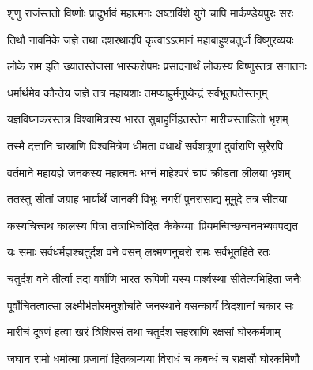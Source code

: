 

\translink{}

\storymeta



\twolineshloka
{शृणु राजंस्ततो विष्णोः प्रादुर्भावं महात्मनः}
{अष्टाविंशे युगे चापि मार्कण्डेयपुरः सरः}


\twolineshloka
{तिथौ नावमिके जज्ञे तथा दशरथादपि}
{कृत्वाऽऽत्मानं महाबाहुश्चतुर्धा विष्णुरव्ययः}


\twolineshloka
{लोके राम इति ख्यातस्तेजसा भास्करोपमः}
{प्रसादनार्थं लोकस्य विष्णुस्तत्र सनातनः}


\twolineshloka
{धर्मार्थमेव कौन्तेय जज्ञे तत्र महायशाः}
{तमप्याहुर्मनुष्येन्द्रं सर्वभूतपतेस्तनुम्}


\twolineshloka
{यज्ञविघ्नकरस्तत्र विश्वामित्रस्य भारत}
{सुबाहुर्निहतस्तेन मारीचस्ताडितो भृशम्}


\twolineshloka
{तस्मै दत्तानि चास्राणि विश्वमित्रेण धीमता}
{वधार्थं सर्वशत्रूणां दुर्वाराणि सुरैरपि}


\twolineshloka
{वर्तमाने महायज्ञे जनकस्य महात्मनः}
{भग्नं माहेश्वरं चापं क्रीडता लीलया भृशम्}


\twolineshloka
{ततस्तु सीतां जग्राह भार्यार्थे जानकीं विभुः}
{नगरीं पुनरासाद्य मुमुदे तत्र सीतया}


\twolineshloka
{कस्यचित्त्वथ कालस्य पित्रा तत्राभिचोदितः}
{कैकेय्याः प्रियमन्विच्छन्वनमभ्यवपद्यत}


\twolineshloka
{यः समाः सर्वधर्मज्ञश्चतुर्दश वने वसन्}
{लक्ष्मणानुचरो रामः सर्वभूतहिते रतः}


\twolineshloka
{चतुर्दश वने तीर्त्वा तदा वर्षाणि भारत}
{रूपिणी यस्य पार्श्वस्था सीतेत्यभिहिता जनैः}


\twolineshloka
{पूर्वोचितत्वात्सा लक्ष्मीर्भर्तारमनुशोचति}
{जनस्थाने वसन्कार्यं त्रिदशानां चकार सः}


\twolineshloka
{मारीचं दूषणं हत्वा खरं त्रिशिरसं तथा}
{चतुर्दश सहस्राणि रक्षसां घोरकर्मणाम्}


\twolineshloka
{जघान रामो धर्मात्मा प्रजानां हितकाम्यया}
{विराधं च कबन्धं च राक्षसौ घोरकर्मिणौ}


